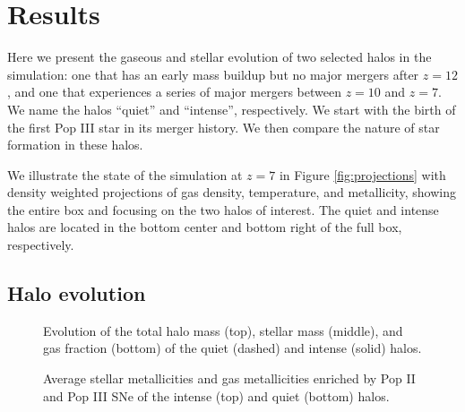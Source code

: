 \documentclass[apjl]{emulateapj}
\begin{document}
\section{Results}
\label{sec:results}

\begin{figure*}
  \caption{\label{fig:projections} Density-weighted projections of gas
    density (top), temperature (middle), and metallicity (bottom) at
    $z=7$.  The left column shows the entire simulation volume, where
    the center and right columns focus on the intense and quiet halos,
    respectively.  The metallicity projections are a composite picture
    of metals originating from Pop III (red) and Pop II (blue) stars.}
\end{figure*}

Here we present the gaseous and stellar evolution of two selected
halos in the simulation: one that has an early mass buildup but no
major mergers after $z=12$, and one that experiences a series of major
mergers between $z=10$ and $z=7$.  We name the halos ``quiet'' and
``intense'', respectively.  We start with the birth of the first Pop
III star in its merger history.  We then compare the nature of star
formation in these halos.

We illustrate the state of the simulation at $z=7$ in Figure
\ref{fig:projections} with density weighted projections of gas
density, temperature, and metallicity, showing the entire box and
focusing on the two halos of interest.  The quiet and intense halos
are located in the bottom center and bottom right of the full box,
respectively.

\subsection{Halo evolution}
\label{sec:halo}

\begin{figure}
  \caption{\label{fig:evo} Evolution of the total halo mass (top),
    stellar mass (middle), and gas fraction (bottom) of the quiet
    (dashed) and intense (solid) halos.}
\end{figure}

\begin{figure}
  \caption{\label{fig:Zevo} Average stellar metallicities and gas
    metallicities enriched by Pop II and Pop III SNe of the
    intense (top) and quiet (bottom) halos.}
\end{figure}
\end{document}
